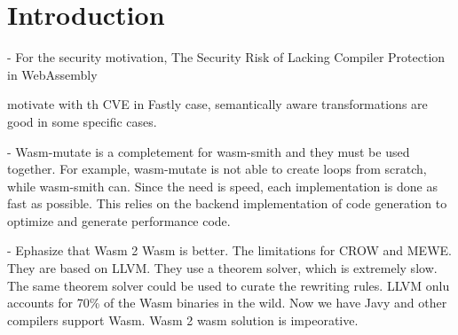 \documentclass[sigplan,screen]{acmart}
\begin{document}
\maketitle


\section{Introduction}

- For the security motivation, The Security Risk of Lacking Compiler Protection in WebAssembly \cite{stievenart2021security}

motivate with th CVE in Fastly case, semantically aware transformations are good in some specific cases. 

- Wasm-mutate is a completement for wasm-smith and they must be used together. For example, wasm-mutate is not able to create loops from scratch, while wasm-smith can. Since the need is speed, each implementation is done as fast as possible. This relies on the backend implementation of code generation to optimize and generate performance code.

- Ephasize that Wasm 2 Wasm is better.  The limitations for CROW and MEWE. They are based on LLVM. They use a theorem solver, which is extremely slow. The same theorem solver could be used to curate the rewriting rules. LLVM onlu accounts for 70\% of the Wasm binaries in the wild. Now we have Javy and other compilers support Wasm. Wasm 2 wasm solution is impeorative.
\end{document}

